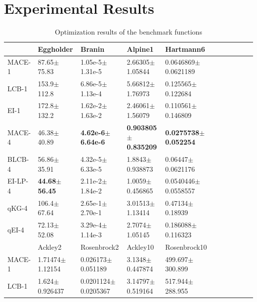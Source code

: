 \section{Experimental Results}

\begin{table}[t]
    \centering
    \caption{Optimization results of the benchmark functions}
    \label{tab:result_analytical}
    \begin{tabular}{lllllllllll}
        \toprule
                & Eggholder                &  Branin              &  Alpine1              & Hartmann6                   \\ \midrule
        MACE-1  & 87.65$\pm$75.83          &  1.05e-5$\pm$1.31e-5          & 2.66305$\pm$1.05844            & 0.0646869$\pm$0.0621189 \\
        LCB-1   & 153.9$\pm$112.8          &  6.86e-5$\pm$1.13e-4          & 5.66812$\pm$1.76973            & 0.125565$\pm$0.122684   \\
        EI-1    & 172.8$\pm$132.2          &  1.62e-2$\pm$1.63e-2          & 2.46061$\pm$1.56079            & 0.110561$\pm$0.146809   \\
        MACE-4  & 46.38$\pm$40.89          &  \textbf{4.62e-6$\pm$6.64e-6} & \textbf{0.903805$\pm$0.835209} & \textbf{0.0275738$\pm$0.052254}  \\
        BLCB-4  & 56.86$\pm$35.91          &  4.32e-5$\pm$6.33e-5          & 1.8843$\pm$0.938873            & 0.06447$\pm$0.0621176   \\
        EI-LP-4 & \textbf{44.68$\pm$56.45} &  2.11e-2$\pm$1.84e-2          & 1.0059$\pm$0.456865            & 0.0540446$\pm$0.0558557 \\
        qKG-4   & 106.4$\pm$67.64          &  2.65e-1$\pm$2.70e-1          & 3.01513$\pm$1.13414            & 0.47134$\pm$0.18939     \\
        qEI-4   & 72.13$\pm$52.08          &  3.29e-4$\pm$1.14e-3          & 2.7074$\pm$1.05145             & 0.186088$\pm$0.116323   \\
        \hline
                & Ackley2                       &  Rosenbrock2               & Ackley10              & Rosenbrock10        \\ \midrule
        MACE-1  & 1.71474$\pm$1.12154           &  0.026173$\pm$0.051189              & 3.1348$\pm$0.447874           & 499.697$\pm$300.899 \\
        LCB-1   & 1.624$\pm$0.926437            &  0.0201124$\pm$0.0205367            & 3.14797$\pm$0.519164          & 517.944$\pm$288.955 \\

\end{tabular}
\end{table}
